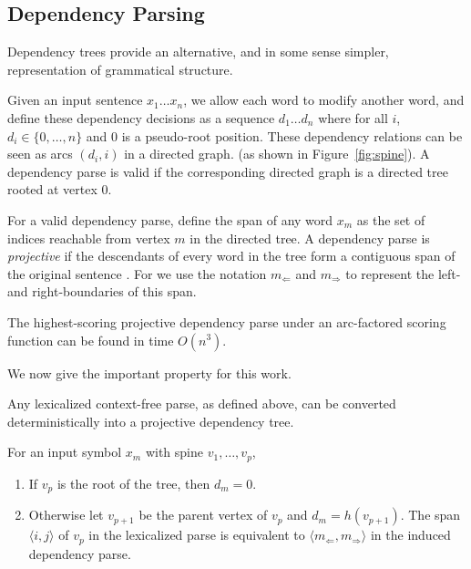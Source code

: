 \documentclass[11pt,letterpaper]{article}
\newcommand{\Left}[1]{#1_{\Leftarrow}}
\newcommand{\Right}[1]{#1_{\Rightarrow}}
\newcommand{\Span}[1]{\langle #1 \rangle}
\begin{document}
\subsection{Dependency Parsing}

Dependency trees provide an alternative, and in some sense simpler,
representation of grammatical structure.

Given an input sentence $x_1
\ldots x_n$, we allow each word to modify another word,  and define these dependency decisions as a sequence $d_1 \ldots d_n$ where for all $i$, $d_i \in \{0, \ldots, n\}$ and $0$ is a pseudo-root position. These dependency relations can be seen as arcs $(d_i, i)$ in a directed graph. (as
shown in Figure~\ref{fig:spine}). A dependency parse is valid  if the corresponding directed graph is a directed tree rooted at
vertex $0$.

For a valid dependency parse, define the span of any word $x_m$ as the set of indices reachable from vertex $m$ in the directed tree. A dependency parse is \textit{projective} if the descendants of every word in the tree form a contiguous span of the original sentence \cite{}. For we use the notation $\Left{m}$ and $\Right{m}$ to represent the left- and
right-boundaries of this span.

The highest-scoring projective dependency parse under an arc-factored scoring function can be found in time $O(n^3)$.







We now give the important property for this work.

Any lexicalized context-free parse, as defined above, can be converted
deterministically into a projective dependency tree.


For an input symbol $x_m$ with spine $v_1, \ldots, v_p$,

\begin{enumerate}
\item If $v_p$ is the root of the tree,
then $d_m = 0$.
\item Otherwise let $v_{p+1}$ be the parent vertex of
$v_p$ and $d_m = h(v_{p+1})$. The span $\Span{i, j}$ of $v_p$ in the lexicalized parse is equivalent to $\Span{\Left{m}, \Right{m}}$
in the induced dependency parse.
\end{enumerate}
\end{document}
